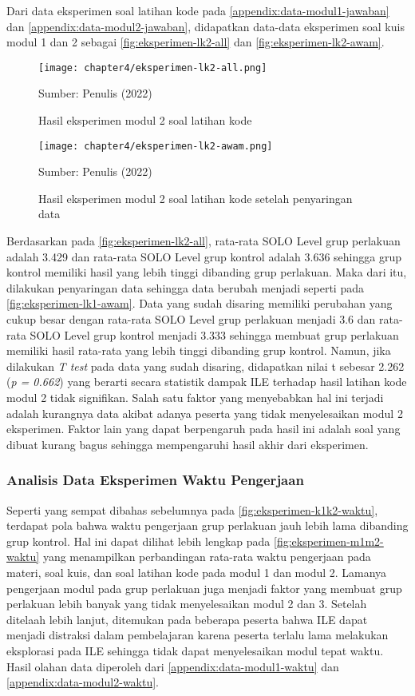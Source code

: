 Dari data eksperimen soal latihan kode pada \autoref{appendix:data-modul1-jawaban} dan \autoref{appendix:data-modul2-jawaban}, didapatkan data-data eksperimen soal kuis modul 1 dan 2 sebagai \autoref{fig:eksperimen-lk2-all} dan \autoref{fig:eksperimen-lk2-awam}.

\begin{figure}[!h]
  \centering
  \texttt{[image: chapter4/eksperimen-lk2-all.png]}
  \caption{Hasil eksperimen modul 2 soal latihan kode} \label{fig:eksperimen-lk2-all}
  Sumber: Penulis (2022)
\end{figure}
\begin{figure}[!h]
  \centering
  \texttt{[image: chapter4/eksperimen-lk2-awam.png]}
  \caption{Hasil eksperimen modul 2 soal latihan kode setelah penyaringan data} \label{fig:eksperimen-lk2-awam}
  Sumber: Penulis (2022)
\end{figure}

Berdasarkan pada \autoref{fig:eksperimen-lk2-all}, rata-rata SOLO Level grup perlakuan adalah 3.429 dan rata-rata SOLO Level grup kontrol adalah 3.636 sehingga grup kontrol memiliki hasil yang lebih tinggi dibanding grup perlakuan. Maka dari itu, dilakukan penyaringan data sehingga data berubah menjadi seperti pada \autoref{fig:eksperimen-lk1-awam}. Data yang sudah disaring memiliki perubahan yang cukup besar dengan rata-rata SOLO Level grup perlakuan menjadi 3.6 dan rata-rata SOLO Level grup kontrol menjadi 3.333 sehingga membuat grup perlakuan memiliki hasil rata-rata yang lebih tinggi dibanding grup kontrol. Namun, jika dilakukan \textit{T test} pada data yang sudah disaring, didapatkan nilai t sebesar 2.262 (\textit{p = 0.662}) yang berarti secara statistik dampak ILE terhadap hasil latihan kode modul 2 tidak signifikan. Salah satu faktor yang menyebabkan hal ini terjadi adalah kurangnya data akibat adanya peserta yang tidak menyelesaikan modul 2 eksperimen. Faktor lain yang dapat berpengaruh pada hasil ini adalah soal yang dibuat kurang bagus sehingga mempengaruhi hasil akhir dari eksperimen.

\subsubsection{Analisis Data Eksperimen Waktu Pengerjaan}
Seperti yang sempat dibahas sebelumnya pada \autoref{fig:eksperimen-k1k2-waktu}, terdapat pola bahwa waktu pengerjaan grup perlakuan jauh lebih lama dibanding grup kontrol. Hal ini dapat dilihat lebih lengkap pada \autoref{fig:eksperimen-m1m2-waktu} yang menampilkan perbandingan rata-rata waktu pengerjaan pada materi, soal kuis, dan soal latihan kode pada modul 1 dan modul 2. Lamanya pengerjaan modul pada grup perlakuan juga menjadi faktor yang membuat grup perlakuan lebih banyak yang tidak menyelesaikan modul 2 dan 3. Setelah ditelaah lebih lanjut, ditemukan pada beberapa peserta bahwa ILE dapat menjadi distraksi dalam pembelajaran karena peserta terlalu lama melakukan eksplorasi pada ILE sehingga tidak dapat menyelesaikan modul tepat waktu. Hasil olahan data diperoleh dari \autoref{appendix:data-modul1-waktu} dan \autoref{appendix:data-modul2-waktu}.


